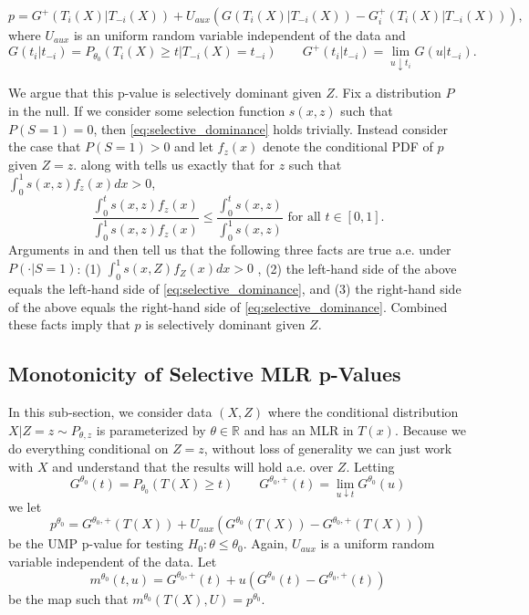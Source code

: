 \documentclass{article}
\newcommand{\R}{\mathbb{R}}
\begin{document}
\begin{appendix}
\begin{equation}
    \label{eq:ump_exp_fam}
    p = G^{+}(T_i(X)|T_{-i}(X)) + U_{aux}(G(T_i(X)|T_{-i}(X)) - G^{+}_i(T_i(X)|T_{-i}(X))),
\end{equation}
where $U_{aux}$ is an uniform random variable independent of the data and 
\begin{equation*}
    G(t_i | t_{-i}) = P_{\theta_0}(T_i(X) \geq t | T_{-i}(X) = t_{-i}) \qquad G^{+}(t_i | t_{-i}) = \lim_{u \downarrow t_i} G(u| t_{-i}).
\end{equation*}

We argue that this p-value is selectively dominant given $Z$. Fix a distribution $P$ in the null. If we consider some selection function $s(x, z)$ such that $P(S= 1) = 0$, then \eqref{eq:selective_dominance} holds trivially. Instead consider the case that $P(S= 1) > 0$ and let $f_{z}(x)$ denote the conditional PDF of $p$ given $Z=z$.  along with  tells us exactly that for $z$ such that $\int_0^1 s(x, z) f_z(x) dx > 0$,
\begin{equation*}
    \frac{\int_0^t s(x, z) f_z(x)}{\int_0^1 s(x, z) f_z(x)} \leq \frac{\int_0^t s(x, z) }{\int_0^1 s(x, z)}  \text{ for all } t \in [0, 1].
\end{equation*}
Arguments in  and  then tell us that the following three facts are true a.e. under $P(\cdot | S=1)$: (1) $\int_0^1 s(x, Z) f_Z(x) dx > 0$ , (2) the left-hand side of the above equals the left-hand side of \eqref{eq:selective_dominance}, and (3) the right-hand side of the above equals the right-hand side of \eqref{eq:selective_dominance}. Combined these facts imply that $p$ is selectively dominant given $Z$. 


\subsection{Monotonicity of Selective MLR p-Values}
\label{sec:one_sided_monotone_appdx}

In this sub-section, we consider data $(X, Z)$ where the conditional distribution $X | Z= z \sim P_{\theta, z}$ is parameterized by $\theta \in \R$ and has an MLR in $T(x)$. Because we do everything conditional on $Z=z$, without loss of generality we can just work with $X$ and understand that the results will hold a.e. over $Z$. Letting
\begin{equation*}
    G^{\theta_0}(t) = P_{\theta_0}(T(X) \geq t) \qquad G^{\theta_0, +}(t) = \lim_{u \downarrow t} G^{\theta_0}(u)
\end{equation*}
we let 
\begin{equation*}
    p^{\theta_0} = G^{\theta_0, +}(T(X)) + U_{aux}(G^{\theta_0}(T(X)) - G^{\theta_0, +}(T(X)))
\end{equation*}
be the UMP p-value for testing $H_{0}: \theta \leq \theta_0$. Again, $U_{aux}$ is a uniform random variable independent of the data. Let 
\begin{equation*}
    m^{\theta_0}(t, u) = G^{\theta_0, +}(t) + u(G^{\theta_0}(t) - G^{\theta_0, +}(t))
\end{equation*}
be the map such that $m^{\theta_0}(T(X), U) = p^{\theta_0}$. 


\end{appendix}
\end{document}
